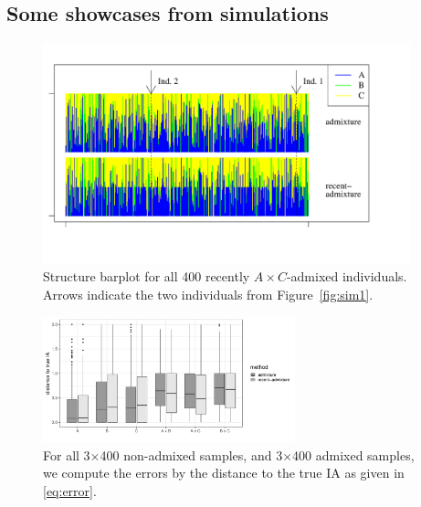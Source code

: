 \documentclass[12pt]{article}
\theoremstyle{definition}
\begin{document}
\subsection{Some showcases from simulations}
\enlargethispage{0cm}
\begin{figure}[H]
  \begin{center}
    \parbox[b]{0.9\textwidth}{\includegraphics[width=0.95\textwidth]{abc_StructurePlot.pdf}\vspace{-2cm}}
  \end{center}
  \caption{\label{Sfig:sim2} Structure barplot for all 400 recently
    $A\times C$-admixed individuals. Arrows indicate the two
    individuals from Figure~\ref{fig:sim1}.}
\end{figure}

\begin{figure}[H]
  \begin{center}
    \parbox[b]{0.5\textwidth}{\includegraphics[width=0.65\textwidth]{deviations_abc.pdf}\vspace{0cm}}
  \end{center}
  \caption{\label{Sfig:sim3} For all 3$\times$400 non-admixed samples,
    and 3$\times$400 admixed samples, we compute the errors by the
    distance to the true IA as given in \eqref{eq:error}.}
\end{figure}

\newpage
\end{document}
